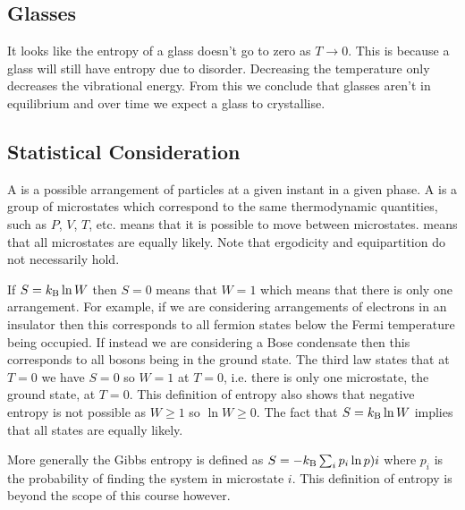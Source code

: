     \subsection{Glasses}
    It looks like the entropy of a glass doesn't go to zero as \(T \to 0\).
    This is because a glass will still have entropy due to disorder.
    Decreasing the temperature only decreases the vibrational energy.
    From this we conclude that glasses aren't in equilibrium and over time we expect a glass to crystallise.
    
    \subsection{Statistical Consideration}
    A  is a possible arrangement of particles at a given instant in a given phase.
    A  is a group of microstates which correspond to the same thermodynamic quantities, such as \(P\), \(V\), \(T\), etc.
     means that it is possible to move between microstates.
     means that all microstates are equally likely. Note that ergodicity and equipartition do not necessarily hold.
    
    If \(S = k_\mathrm{B}\ln W\) then \(S = 0\) means that \(W = 1\) which means that there is only one arrangement.
    For example, if we are considering arrangements of electrons in an insulator then this corresponds to all fermion states below the Fermi temperature being occupied.
    If instead we are considering a Bose condensate then this corresponds to all bosons being in the ground state.
    The third law states that at \(T = 0\) we have \(S = 0\) so \(W = 1\) at \(T = 0\), i.e. there is only one microstate, the ground state, at \(T = 0\).
    This definition of entropy also shows that negative entropy is not possible as \(W \ge 1\) so \(\ln W \ge 0\).
    The fact that \(S = k_\mathrm{B} \ln W\) implies that all states are equally likely.
    
    More generally the Gibbs entropy is defined as \(S = -k_\mathrm{B} \sum_i p_i\ln p)i\) where \(p_i\) is the probability of finding the system in microstate \(i\).
    This definition of entropy is beyond the scope of this course however.
    
